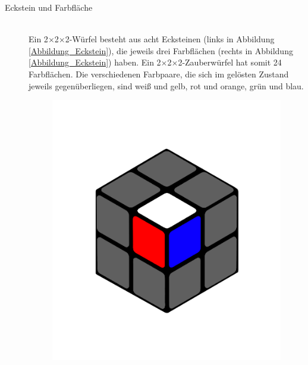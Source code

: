 \documentclass[12pt,a4paper, usenames, dvipsnames]{article}
\theoremstyle{mystyle}
\theoremstyle{definition}
\newcommand{\Ttwo}{2$\times$2$\times$2-}
\begin{document}
\begin{description}
\item[Eckstein und Farbfläche] \ \\
Ein \Ttwo Würfel besteht aus acht Ecksteinen (links in Abbildung \ref{Abbildung_Eckstein}), die jeweils drei Farbflächen (rechts in Abbildung \ref{Abbildung_Eckstein}) haben. Ein \Ttwo Zauberwürfel hat somit 24 Farbflächen. Die verschiedenen Farbpaare, die sich im gelösten Zustand jeweils gegenüberliegen, sind weiß und gelb, rot und orange, grün und blau.
\begin{figure}[h]
\centering
\includegraphics[scale=0.1]{2x2stein.png}

\end{figure}
\end{description}
\end{document}
